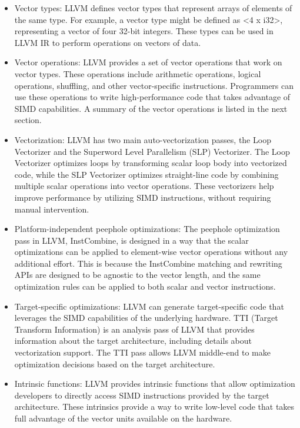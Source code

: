 \begin{itemize}

\item Vector types: LLVM defines vector types that represent arrays of
  elements of the same type. For example, a vector type might be
  defined as <4 x i32>, representing a vector of four 32-bit integers.
  These types can be used in LLVM IR to perform operations on vectors
  of data.

\item Vector operations: LLVM provides a set of vector operations that
  work on vector types. These operations include arithmetic operations,
  logical operations, shuffling, and other vector-specific
  instructions. Programmers can use these operations to write
  high-performance code that takes advantage of SIMD capabilities.
  A summary of the vector operations is listed in the next section.

\item Vectorization: LLVM has two main auto-vectorization passes, the
  Loop Vectorizer and the Superword Level Parallelism (SLP)
  Vectorizer.
  The Loop Vectorizer optimizes loops by transforming scalar loop body
  into vectorized code, while the SLP Vectorizer optimizes
  straight-line code by combining multiple scalar operations into
  vector operations.
  These vectorizers help improve performance by utilizing SIMD
  instructions, without requiring manual intervention.

\item Platform-independent peephole optimizations: The peephole
  optimization pass in LLVM, InstCombine, is designed in a way that
  the scalar optimizations can be applied to element-wise vector
  operations without any additional effort.
  This is because the InstCombine matching and rewriting APIs are
  designed to be agnostic to the vector length, and the same
  optimization rules can be applied to both scalar and vector
  instructions.

\item Target-specific optimizations: LLVM can generate target-specific
  code that leverages the SIMD capabilities of the underlying
  hardware.
  TTI (Target Transform Information) is an analysis pass of LLVM that
  provides information about the target architecture, including
  details about vectorization support.
  The TTI pass allows LLVM middle-end to make optimization decisions
  based on the target architecture.


\item Intrinsic functions: LLVM provides intrinsic functions that
  allow optimization developers to directly access SIMD instructions
  provided by the target architecture.
  These intrinsics provide a way
  to write low-level code that takes full advantage of the vector
  units available on the hardware.

\end{itemize}

